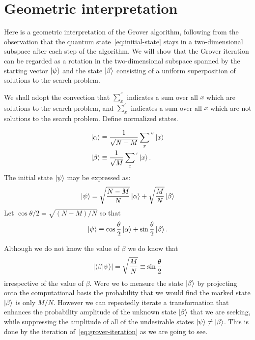 \section{Geometric interpretation}\label{sec:geometric-interpretation}
Here is a geometric interpretation of the Grover algorithm, following from the observation that the quantum state~\ref{eq:initial-state} stays in a two-dimensional subspace after each step of the algorithm. We will show that the Grover iteration can be regarded as a rotation in the two-dimensional subspace spanned by the starting vector $\ket{\psi}$ and the state $\ket{\beta}$ consisting of a uniform superposition of solutions to the search problem. 

We shall adopt the convection that $\sum_{x}^{''}$ indicates a sum over all $x$ which are solutions to the search problem, and $\sum_{x}^{'}$ indicates a sum over all $x$ which are not solutions to the search problem. Define normalized states.

\begin{equation*}
\begin{split}
 \ket{\alpha} &\equiv \frac{1}{\sqrt{N-M}} \sum_{x}{}^{''} \ket{x} \\
 \ket{\beta} &\equiv \frac{1}{\sqrt{M}} \sum_{x}{}^{'} \ket{x}.
\end{split}
\end{equation*}
The initial state $\ket{\psi}$ may be expressed as:
\begin{equation*}
    \ket{\psi} = \sqrt{\frac{N-M}{N}} \ket{\alpha} + \sqrt{\frac{M}{N}} \ket{\beta}
\end{equation*}
 Let $\cos\theta/2 = \sqrt{(N-M)/N}$ so that 
 \begin{equation*}
 \ket{\psi} \equiv \cos\frac{\theta}{2}\ket{\alpha} + \sin\frac{\theta}{2}\ket{\beta}.
 \end{equation*}
 
Although we do not know the value of $\beta$ we do know that 
\begin{equation}\label{eq:beta-projection}
    \lvert\braket{\beta | \psi}\rvert = \sqrt{\frac{M}{N}} \equiv \sin\frac{\theta}{2}
\end{equation}
irrespective of the value of $\beta$. Were we to measure the state $\ket{\beta}$ by projecting onto the computational basis the probability that we would find the marked state $\ket{\beta}$ is only $M/N$.  However we can repeatedly iterate a transformation that enhances the probability amplitude of the unknown state $\ket{\beta}$ that we are seeking, while suppressing the amplitude of all of the
undesirable states $\ket{\psi} \neq \ket{\beta}$. This is done by the iteration of~\ref{eq:grover-iteration} as we are going to see.

